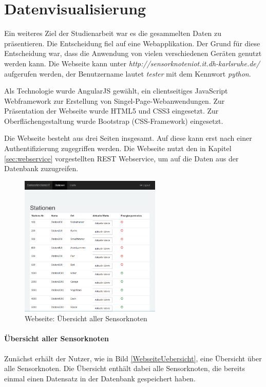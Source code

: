 \section{Datenvisualisierung}
\label{sec:Datenvisualiserung}
Ein weiteres Ziel der Studienarbeit war es die gesammelten Daten zu präsentieren. Die Entscheidung fiel auf eine Webapplikation. Der Grund für diese Entscheidung war, dass die Anwendung von vielen verschiedenen Geräten genutzt werden kann. Die Webseite kann unter \textit{ http://sensorknoteniot.it.dh-karlsruhe.de/} aufgerufen werden, der Benutzername lautet \textit{tester} mit dem Kennwort \textit{python}.

Als Technologie wurde AngularJS gewählt, ein clientseitiges JavaScript Webframework zur Erstellung von Singel-Page-Webanwendungen. Zur Präsentation der Webseite wurde HTML5 und CSS3 eingesetzt. Zur Oberflächengestaltung wurde Bootstrap (CSS-Framework) eingesetzt.

Die Webseite besteht aus drei Seiten insgesamt. Auf diese kann erst nach einer Authentifizierung zugegriffen werden. Die Webseite nutzt den in Kapitel \ref{sec:webservice} vorgestellten REST Webservice, um auf die Daten aus der Datenbank zuzugreifen.
\begin{figure}
	\centering
	\includegraphics[width=0.6\textwidth]{bilder/WebseiteUebersicht}
	\caption{Webseite: Übersicht aller Sensorknoten}
	\label{img:WebseiteUebersicht}
\end{figure}

\paragraph{Übersicht aller Sensorknoten} Zunächst erhält der Nutzer, wie in Bild \ref{WebseiteUebersicht}, eine Übersicht über alle Sensorknoten. Die Übersicht enthält dabei alle Sensorknoten, die bereits einmal einen Datensatz in der Datenbank gespeichert haben.


